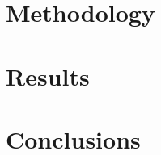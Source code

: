 \documentclass{report}
\begin{document}

\chapter{Methodology}
\chapter{Results}
\chapter{Conclusions}



\listoffigures
\listoftables
\end{document}
